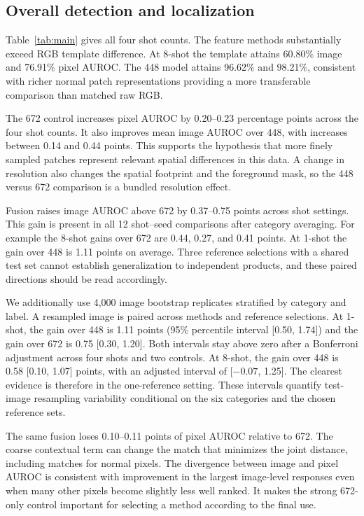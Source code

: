 \documentclass[10pt,twocolumn,letterpaper]{article}
\begin{document}
\subsection{Overall detection and localization}
Table~\ref{tab:main} gives all four shot counts. The feature methods substantially exceed RGB template difference. At 8-shot the template attains 60.80\% image and 76.91\% pixel AUROC. The 448 model attains 96.62\% and 98.21\%, consistent with richer normal patch representations providing a more transferable comparison than matched raw RGB.

The 672 control increases pixel AUROC by 0.20--0.23 percentage points across the four shot counts. It also improves mean image AUROC over 448, with increases between 0.14 and 0.44 points. This supports the hypothesis that more finely sampled patches represent relevant spatial differences in this data. A change in resolution also changes the spatial footprint and the foreground mask, so the 448 versus 672 comparison is a bundled resolution effect.

Fusion raises image AUROC above 672 by 0.37--0.75 points across shot settings. This gain is present in all 12 shot--seed comparisons after category averaging. For example the 8-shot gains over 672 are 0.44, 0.27, and 0.41 points. At 1-shot the gain over 448 is 1.11 points on average. Three reference selections with a shared test set cannot establish generalization to independent products, and these paired directions should be read accordingly.

We additionally use 4,000 image bootstrap replicates stratified by category and label. A resampled image is paired across methods and reference selections. At 1-shot, the gain over 448 is 1.11 points (95\% percentile interval [0.50, 1.74]) and the gain over 672 is 0.75 [0.30, 1.20]. Both intervals stay above zero after a Bonferroni adjustment across four shots and two controls. At 8-shot, the gain over 448 is 0.58 [0.10, 1.07] points, with an adjusted interval of [$-0.07$, 1.25]. The clearest evidence is therefore in the one-reference setting. These intervals quantify test-image resampling variability conditional on the six categories and the chosen reference sets.

The same fusion loses 0.10--0.11 points of pixel AUROC relative to 672. The coarse contextual term can change the match that minimizes the joint distance, including matches for normal pixels. The divergence between image and pixel AUROC is consistent with improvement in the largest image-level responses even when many other pixels become slightly less well ranked. It makes the strong 672-only control important for selecting a method according to the final use.
\end{document}
